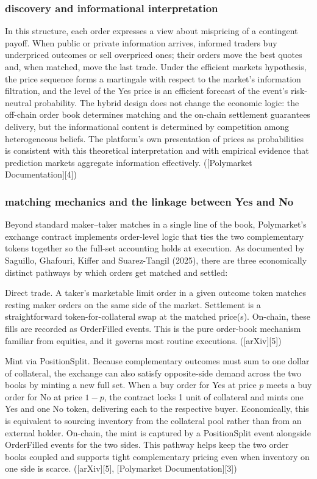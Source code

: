 \subsubsection{discovery and informational interpretation}

In this structure, each order expresses a view about mispricing of a contingent payoff. When public or private information arrives, informed traders buy underpriced outcomes or sell overpriced ones; their orders move the best quotes and, when matched, move the last trade. Under the efficient markets hypothesis, the price sequence forms a martingale with respect to the market’s information filtration, and the level of the Yes price is an efficient forecast of the event’s risk-neutral probability. The hybrid design does not change the economic logic: the off-chain order book determines matching and the on-chain settlement guarantees delivery, but the informational content is determined by competition among heterogeneous beliefs. The platform’s own presentation of prices as probabilities is consistent with this theoretical interpretation and with empirical evidence that prediction markets aggregate information effectively. ([Polymarket Documentation][4])

\subsubsection{matching mechanics and the linkage between Yes and No}

Beyond standard maker–taker matches in a single line of the book, Polymarket’s exchange contract implements order-level logic that ties the two complementary tokens together so the full-set accounting holds at execution. As documented by Saguillo, Ghafouri, Kiffer and Suarez-Tangil (2025), there are three economically distinct pathways by which orders get matched and settled:

Direct trade. A taker’s marketable limit order in a given outcome token matches resting maker orders on the same side of the market. Settlement is a straightforward token-for-collateral swap at the matched price(s). On-chain, these fills are recorded as OrderFilled events. This is the pure order-book mechanism familiar from equities, and it governs most routine executions. ([arXiv][5])

Mint via PositionSplit. Because complementary outcomes must sum to one dollar of collateral, the exchange can also satisfy opposite-side demand across the two books by minting a new full set. When a buy order for Yes at price $p$ meets a buy order for No at price $1-p$, the contract locks 1 unit of collateral and mints one Yes and one No token, delivering each to the respective buyer. Economically, this is equivalent to sourcing inventory from the collateral pool rather than from an external holder. On-chain, the mint is captured by a PositionSplit event alongside OrderFilled events for the two sides. This pathway helps keep the two order books coupled and supports tight complementary pricing even when inventory on one side is scarce. ([arXiv][5], [Polymarket Documentation][3])


